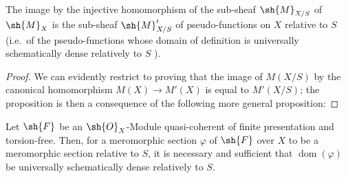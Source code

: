 \begin{proposition}[20.6.3]
\label{IV.20.6.3}
The image by the injective homomorphism  of the sub-sheaf $\sh{M}_{X/S}$ of $\sh{M}_X$ is the sub-sheaf $\sh{M}'_{X/S}$ of pseudo-functions on $X$ relative to $S$ (i.e.\ of the pseudo-functions whose domain of definition is universally schematically dense relatively to $S$ ).
\end{proposition}

\begin{proof}
We can evidently restrict to proving that the image of $M(X/S)$ by the canonical homomorphism $M(X)\to M'(X)$ is equal to $M'(X/S)$;
the proposition is then a consequence of the following more general proposition:
\end{proof}

\begin{proposition}[20.6.4]
\label{IV.20.6.4}
Let $\sh{F}$ be an $\sh{O}_X$-Module quasi-coherent of finite presentation and torsion-free.
Then, for a meromorphic section $\varphi$ of $\sh{F}$ over $X$ to be a meromorphic section relative to $S$, it is necessary and sufficient that $\operatorname{dom}(\varphi)$ be universally schematically dense relatively to $S$.
\end{proposition}

